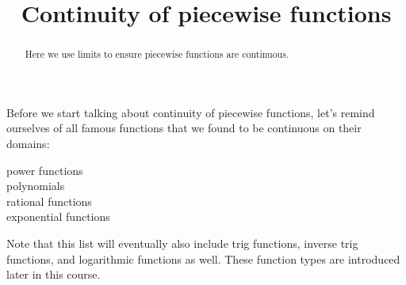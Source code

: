 \documentclass{ximera}
\title{Continuity of piecewise functions}
\begin{document}
\begin{abstract}
Here we use limits to ensure piecewise functions are continuous.
\end{abstract}
\maketitle
Before we start talking about continuity of piecewise functions, let's remind ourselves of all famous functions that we found to be continuous on their domains:

power functions
\\polynomials
\\rational functions
\\exponential functions





Note that this list will eventually also include trig functions, inverse trig functions, and logarithmic functions as well. These function types are introduced later in this course.
\end{document}
